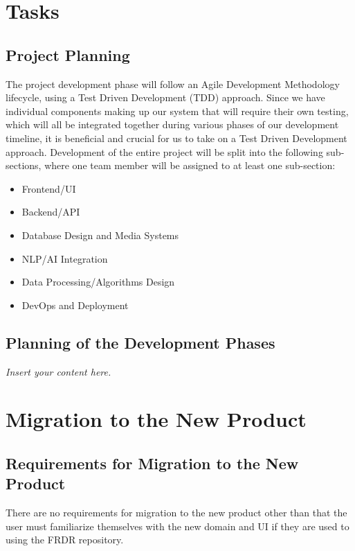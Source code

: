 \documentclass[12pt]{article}
\newcommand{\lips}{\textit{Insert your content here.}}
\begin{document}
\section{Tasks}
\subsection{Project Planning}

\par{The project development phase will follow an Agile Development Methodology lifecycle, using a Test Driven Development (TDD) approach. 
Since we have individual components making up our system that will require their own testing, which will all be integrated together 
during various phases of our development timeline, it is beneficial and crucial for us to take on a Test Driven Development approach. \newline \indent 
Development of the entire project will be split into the following sub-sections, where one team member will be assigned to at least one 
sub-section:}

\begin{itemize}
    \item Frontend/UI
    \item Backend/API
    \item Database Design and Media Systems
    \item NLP/AI Integration
    \item Data Processing/Algorithms Design
    \item DevOps and Deployment
\end{itemize}

\subsection{Planning of the Development Phases}
\lips

\section{Migration to the New Product}
\subsection{Requirements for Migration to the New Product}

\par{There are no requirements for migration to the new product other than that the user must familiarize themselves with the new domain and UI if they are used to using the FRDR repository.}
\end{document}
